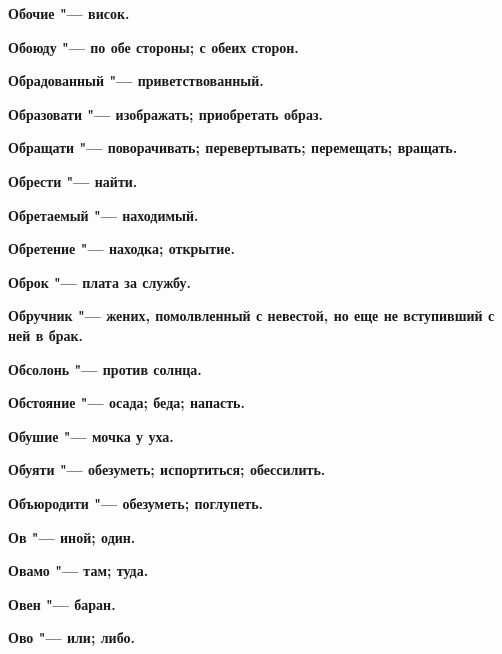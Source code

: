 \begin{mymulticols}{2}
\bfseries Обочие\normalfont{} "--- висок. 




\bfseries Обоюду\normalfont{} "--- по обе стороны; с обеих сторон. 




\bfseries Обрадованный\normalfont{} "--- приветствованный. 




\bfseries Образовати\normalfont{} "--- изображать; приобретать образ. 




\bfseries Обращати\normalfont{} "--- поворачивать; перевертывать; перемещать; вращать. 




\bfseries Обрести\normalfont{} "--- найти. 




\bfseries Обретаемый\normalfont{} "--- находимый. 




\bfseries Обретение\normalfont{} "--- находка; открытие. 




\bfseries Оброк\normalfont{} "--- плата за службу. 




\bfseries Обручник\normalfont{} "--- жених, помолвленный с невестой, но еще не вступивший с ней в брак. 




\bfseries Обсолонь\normalfont{} "--- против солнца. 




\bfseries Обстояние\normalfont{} "--- осада; беда; напасть. 




\bfseries Обушие\normalfont{} "--- мочка у уха. 




\bfseries Обуяти\normalfont{} "--- обезуметь; испортиться; обессилить. 




\bfseries Объюродити\normalfont{} "--- обезуметь; поглупеть. 




\bfseries Ов\normalfont{} "--- иной; один. 




\bfseries Овамо\normalfont{} "--- там; туда. 




\bfseries Овен\normalfont{} "--- баран. 




\bfseries Ово\normalfont{} "--- или; либо. 





\end{mymulticols}
